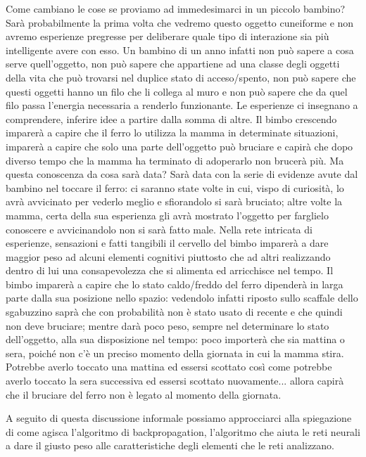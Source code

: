 Come cambiano le cose se proviamo ad immedesimarci in un piccolo bambino? Sarà probabilmente la prima volta che vedremo questo oggetto cuneiforme e non avremo esperienze pregresse per deliberare quale tipo di interazione sia più intelligente avere con esso. Un bambino di un anno infatti non può sapere a cosa serve quell'oggetto, non può sapere che appartiene ad una classe degli oggetti della vita che può trovarsi nel duplice stato di acceso/spento, non può sapere che questi oggetti hanno un filo che li collega al muro e non può sapere che da quel filo passa l'energia necessaria a renderlo funzionante. Le esperienze ci insegnano a comprendere, inferire idee a partire dalla somma di altre. Il bimbo crescendo imparerà a capire che il ferro lo utilizza la mamma in determinate situazioni, imparerà a capire che solo una parte dell'oggetto può bruciare e capirà che dopo diverso tempo che la mamma ha terminato di adoperarlo non brucerà più. Ma questa conoscenza da cosa sarà data? Sarà data con la serie di evidenze avute dal bambino nel toccare il ferro: ci saranno state volte in cui, vispo di curiosità, lo avrà avvicinato per vederlo meglio e sfiorandolo si sarà bruciato; altre volte la mamma, certa della sua esperienza gli avrà mostrato l'oggetto per farglielo conoscere e avvicinandolo non si sarà fatto male. Nella rete intricata di esperienze, sensazioni e fatti tangibili il cervello del bimbo imparerà a dare maggior peso ad alcuni elementi cognitivi piuttosto che ad altri realizzando dentro di lui una consapevolezza che si alimenta ed arricchisce nel tempo. Il bimbo imparerà a capire che lo stato caldo/freddo del ferro dipenderà in larga parte dalla sua posizione nello spazio: vedendolo infatti riposto sullo scaffale dello sgabuzzino saprà che con probabilità non è stato usato di recente e che quindi non deve bruciare; mentre darà poco peso, sempre nel determinare lo stato dell'oggetto, alla sua disposizione nel tempo: poco importerà che sia mattina o sera, poiché non c'è un preciso momento della giornata in cui la mamma stira. Potrebbe averlo toccato una mattina ed essersi scottato così come potrebbe averlo toccato la sera successiva ed essersi scottato nuovamente... allora capirà che il bruciare del ferro non è legato al momento della giornata. 

A seguito di questa discussione informale possiamo approcciarci alla spiegazione di come agisca l'algoritmo di backpropagation, l'algoritmo che aiuta le reti neurali a dare il giusto peso alle caratteristiche degli elementi che le reti analizzano. 
